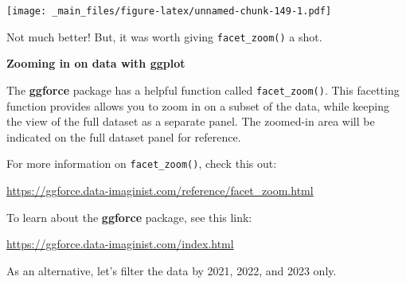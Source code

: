 \documentclass[
]{book}
\begin{document}
\texttt{[image: \_main\_files/figure-latex/unnamed-chunk-149-1.pdf]}

Not much better! But, it was worth giving \texttt{facet\_zoom()} a shot.

\begin{blackbox}

\begin{center}
\textbf{Zooming in on data with ggplot}

\end{center}

The \textbf{ggforce} package has a helpful function called \texttt{facet\_zoom()}. This facetting function provides allows you to zoom in on a subset of the data, while keeping the view of the full dataset as a separate panel. The zoomed-in area will be indicated on the full dataset panel for reference.

For more information on \texttt{facet\_zoom()}, check this out:

\url{https://ggforce.data-imaginist.com/reference/facet_zoom.html}

To learn about the \textbf{ggforce} package, see this link:

\url{https://ggforce.data-imaginist.com/index.html}

\end{blackbox}

As an alternative, let's filter the data by 2021, 2022, and 2023 only.
\end{document}
